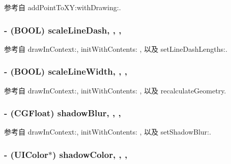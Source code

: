 参考自 add\-Point\-To\-X\-Y\-:with\-Drawing\-:.

\hypertarget{interface_r_m_path_afccc6b38950cc3acd53faf1deca80a20}{
\subsubsection[{scale\-Line\-Dash}]{\setlength{\rightskip}{0pt plus 5cm}-\/ (B\-O\-O\-L) scale\-Line\-Dash\hspace{0.3cm}{\ttfamily [read]}, {\ttfamily [write]}, {\ttfamily [nonatomic]}, {\ttfamily [assign]}}}\label{interface_r_m_path_afccc6b38950cc3acd53faf1deca80a20}


参考自 draw\-In\-Context\-:, init\-With\-Contents\-: , 以及 set\-Line\-Dash\-Lengths\-:.

\hypertarget{interface_r_m_path_a5736a6c5b238f1b928bdfd0659bc9093}{
\subsubsection[{scale\-Line\-Width}]{\setlength{\rightskip}{0pt plus 5cm}-\/ (B\-O\-O\-L) scale\-Line\-Width\hspace{0.3cm}{\ttfamily [read]}, {\ttfamily [write]}, {\ttfamily [nonatomic]}, {\ttfamily [assign]}}}\label{interface_r_m_path_a5736a6c5b238f1b928bdfd0659bc9093}


参考自 draw\-In\-Context\-:, init\-With\-Contents\-: , 以及 recalculate\-Geometry.

\hypertarget{interface_r_m_path_ac6266f68f5c8dc01aa913e5a74f8ac11}{
\subsubsection[{shadow\-Blur}]{\setlength{\rightskip}{0pt plus 5cm}-\/ (C\-G\-Float) shadow\-Blur\hspace{0.3cm}{\ttfamily [read]}, {\ttfamily [write]}, {\ttfamily [nonatomic]}, {\ttfamily [assign]}}}\label{interface_r_m_path_ac6266f68f5c8dc01aa913e5a74f8ac11}


参考自 draw\-In\-Context\-:, init\-With\-Contents\-: , 以及 set\-Shadow\-Blur\-:.

\hypertarget{interface_r_m_path_a2478b26b83164f11d71b5c716c733c34}{
\subsubsection[{shadow\-Color}]{\setlength{\rightskip}{0pt plus 5cm}-\/ (U\-I\-Color$\ast$) shadow\-Color\hspace{0.3cm}{\ttfamily [read]}, {\ttfamily [write]}, {\ttfamily [nonatomic]}, {\ttfamily [retain]}}}\label{interface_r_m_path_a2478b26b83164f11d71b5c716c733c34}


